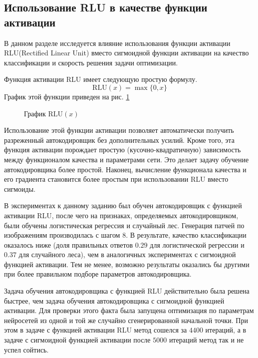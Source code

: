 \documentclass[12pt]{article}
\begin{document}
	\subsection{Использование RLU в качестве функции активации}
		\hspace{0.6cm}В данном разделе исследуется влияние использования функции активации RLU(Rectified Linear Unit) вместо сигмоидной функции активации на качество классификации и скорость решения задачи оптимизации.

		Функция активации RLU имеет следующую простую формулу.
		$$\mbox{RLU}(x) = \max\{0, x\}$$
		График этой функции приведен на рис. \ref{RLU}

		\begin{figure}[!h]
		\centerline{}
			\caption{График $\mbox{RLU}(x)$}
			\label{RLU}
		\end{figure}

		Использование этой функции активации позволяет автоматически получить разреженный автокодировщик без дополнительных усилий. Кроме того, эта функция активации порождает простую (кусочно-квадратичную) зависимость между функционалом качества и параметрами сети. Это делает задачу обучение автокодировщика более простой. Наконец, вычисление функционала качества и его градиента становится более простым при использовании RLU вместо сигмоиды.

		В экспериментах к данному заданию был обучен автокодировщик с функцией активации RLU, после чего на признаках, определяемых автокодировщиком, были обучены логистическая регрессия и случайный лес. Генерация патчей по изображениям производилась с шагом $8$. В результате, качество классификации оказалось ниже (доля правильных ответов $0.29$ для логистической регрессии и $0.37$ для случайного леса), чем в аналогичных экспериментах с сигмоидной функцией активации. Тем не менее, возможно результаты оказались бы другими при более правильном подборе параметров автокодировщика.

		Задача обучения автокодировщика с функцией RLU действительно была решена быстрее, чем задача обучения автокодировщика с сигмоидной функцией активации. Для проверки этого факта была запущена оптимизация по параметрам нейросетей из одной и той же случайно сгенерированной начальной точки. При этом в задаче с функцией активации RLU метод сошелся за $4400$ итераций, а в задаче с сигмоидной функцией активации после $5000$ итераций метод так и не успел сойтись.
\end{document}
